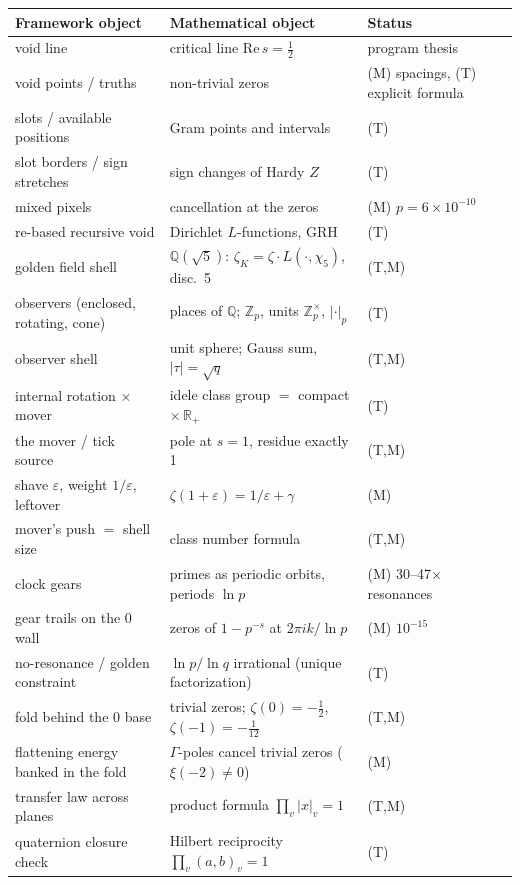 \documentclass[11pt]{article}
\newcommand{\Z}{\mathbb{Z}}
\newcommand{\Q}{\mathbb{Q}}
\newcommand{\R}{\mathbb{R}}
\begin{document}
\begin{table}[t]
\centering\small
\begin{tabular}{@{}lll@{}}
\toprule
Framework object & Mathematical object & Status\\
\midrule
void line & critical line $\mathrm{Re}\,s=\tfrac12$ & program thesis\\
void points / truths & non-trivial zeros & (M) spacings, (T) explicit formula\\
slots / available positions & Gram points and intervals & (T)\\
slot borders / sign stretches & sign changes of Hardy $Z$ & (T)\\
mixed pixels & cancellation at the zeros & (M) $p=6\times10^{-10}$\\
re-based recursive void & Dirichlet $L$-functions, GRH & (T)\\
golden field shell & $\Q(\sqrt5)$: $\zeta_K=\zeta\cdot L(\cdot,\chi_5)$, disc.\ 5 & (T,M)\\
observers (enclosed, rotating, cone) & places of $\Q$; $\Z_p$, units $\Z_p^\times$, $|\cdot|_p$ & (T)\\
observer shell & unit sphere; Gauss sum, $|\tau|=\sqrt q$ & (T,M)\\
internal rotation $\times$ mover & idele class group $=$ compact $\times\,\R_+$ & (T)\\
the mover / tick source & pole at $s=1$, residue exactly 1 & (T,M)\\
shave $\varepsilon$, weight $1/\varepsilon$, leftover & $\zeta(1+\varepsilon)=1/\varepsilon+\gamma$ & (M)\\
mover's push $=$ shell size & class number formula & (T,M)\\
clock gears & primes as periodic orbits, periods $\ln p$ & (M) 30--47$\times$ resonances\\
gear trails on the $0$ wall & zeros of $1-p^{-s}$ at $2\pi ik/\ln p$ & (M) $10^{-15}$\\
no-resonance / golden constraint & $\ln p/\ln q$ irrational (unique factorization) & (T)\\
fold behind the $0$ base & trivial zeros; $\zeta(0)=-\tfrac12$, $\zeta(-1)=-\tfrac1{12}$ & (T,M)\\
flattening energy banked in the fold & $\Gamma$-poles cancel trivial zeros ($\xi(-2)\ne0$) & (M)\\
transfer law across planes & product formula $\prod_v|x|_v=1$ & (T,M)\\
quaternion closure check & Hilbert reciprocity $\prod_v(a,b)_v=1$ & (T)\\

\end{tabular}
\end{table}
\end{document}
